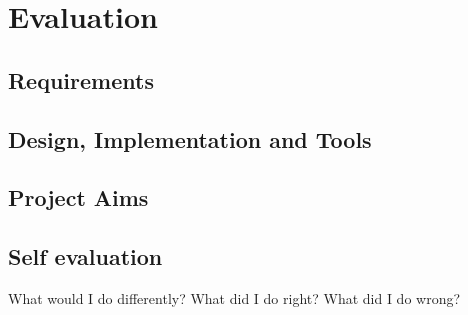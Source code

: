 \chapter{Evaluation}
\begin{comment}

Examiners expect to find a section addressing questions such as:

\begin{itemize}
   \item Were the requirements correctly identified? 
   \item Were the design decisions correct?
   \item Could a more suitable set of tools have been chosen?
   \item How well did the software meet the needs of those who were expecting to use it?
   \item How well were any other project aims achieved?
   \item If you were starting again, what would you do differently?
\end{itemize}

Other questions can be addressed as appropriate for a project. 

Such material is regarded as an important part of your work; it should demonstrate that you are capable not only of carrying out a piece of work but also of thinking critically about how you did it and how you might have done it better. This is seen as an important part of an honours degree. 

There will be good things and room for improvement with any project. As you write this section, identify and discuss the parts of the work that went well and also consider ways in which the work could be improved. 

In the latter stages of the module, we will discuss the evaluation. That will probably be around week 9, although that differs each year. 
\end{comment}
\section{Requirements}


\section{Design, Implementation and Tools}


\section{Project Aims}


\section{Self evaluation}

What would I do differently?
What did I do right?
What did I do wrong?